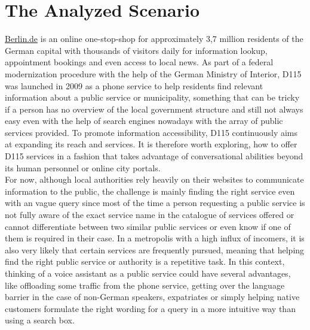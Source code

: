 \section{The Analyzed Scenario}
\label{pubsvc}
\href{https://www.berlin.de}{Berlin.de} is an online one-stop-shop for approximately 3,7 million residents of the German capital\cite{zensus} with thousands of visitors daily for information lookup, appointment bookings and even access to local news.
As part of a federal modernization procedure with the help of the German Ministry of Interior, D115 was launched in 2009 \cite{d115} as a phone service to help residents find relevant information about a public service or municipality, something that can be tricky if a person has no overview of the local government structure and still not always easy even with the help of search engines nowadays with the array of public services provided.
To promote information accessibility, D115 continuously aims at expanding its reach and services.
It is therefore worth exploring, how to offer D115 services in a fashion that takes advantage of conversational abilities beyond its human personnel or online city portals. 
\\

For now, although local authorities rely heavily on their websites to communicate information to the public, the challenge is mainly finding the right service even with an vague query since most of the time a person requesting a public service is not fully aware of the exact service name in the catalogue of services offered or cannot differentiate between two similar public services or even know if one of them is required in their case.
In a metropolis with a high influx of incomers, it is also very likely that certain services are frequently pursued, meaning that helping find the right public service or authority is a repetitive task. In this context, thinking of a voice assistant as a public service could have several advantages, like offloading some traffic from the phone service, getting over the language barrier in the case of non-German speakers, expatriates or simply helping native customers formulate the right wording for a query in a more intuitive way than using a search box. 

